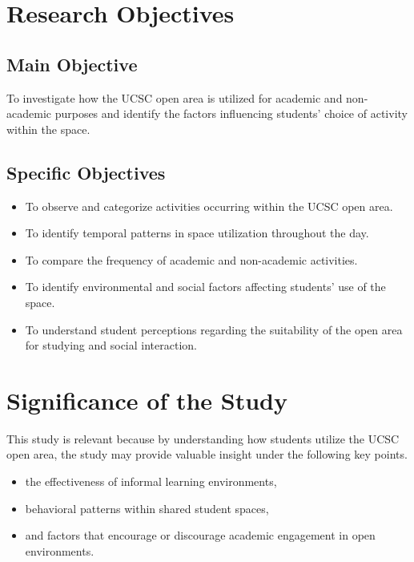 \documentclass[12pt]{report}
\begin{document}
\chapter{Research Objectives}

\section*{Main Objective}

To investigate how the UCSC open area is utilized for academic and non-academic purposes and identify the factors influencing students' choice of activity within the space.

\section*{Specific Objectives}

\begin{itemize}
    \item To observe and categorize activities occurring within the UCSC open area.
    
    \item To identify temporal patterns in space utilization throughout the day.
    
    \item To compare the frequency of academic and non-academic activities.
    
    \item To identify environmental and social factors affecting students' use of the space.
    
    \item To understand student perceptions regarding the suitability of the open area for studying and social interaction.
\end{itemize}


\chapter{Significance of the Study}

This study is relevant because by understanding how students utilize the UCSC open area, the study may provide valuable insight under the following key points.

\begin{itemize}
    \item the effectiveness of informal learning environments,
    \item behavioral patterns within shared student spaces,
    \item and factors that encourage or discourage academic engagement in open environments.
\end{itemize}
\end{document}
